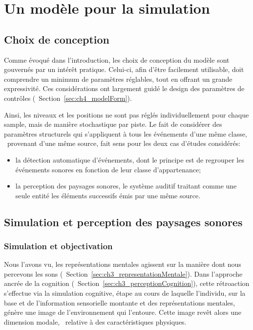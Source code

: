 \section{Un modèle pour la simulation}
\label{sec:ch4_modAnaSo}

\subsection{Choix de conception}

Comme évoqué dans l'introduction, les choix de conception du modèle sont gouvernés par un intérêt pratique. Celui-ci, afin d'être facilement utilisable, doit comprendre un minimum de paramètres réglables, tout en offrant un grande expressivité. Ces considérations ont largement guidé le design des paramètres de contrôles (\cf~Section~\ref{sec:ch4_modelForm}).

Ainsi, les niveaux et les positions ne sont pas réglés individuellement pour chaque sample, mais de manière stochastique par piste. Le fait de considérer des paramètres structurels qui s'appliquent à tous les événements d'une même classe, \ie~provenant d'une même source, fait sens pour les deux cas d'études considérés:

\begin{itemize}
\item la détection automatique d'événements, dont le principe est de regrouper les événements sonores en fonction de leur classe d'appartenance;
\item la perception des paysages sonores, le système auditif traitant comme une seule entité les éléments successifs émis par une même source.
\end{itemize}

\subsection{Simulation et perception des paysages sonores}

\subsubsection{Simulation et objectivation}

Nous l'avons vu, les représentations mentales agissent sur la manière dont nous percevons les sons (\cf~Section~\ref{sec:ch3_representationMentale}). Dans l'approche ancrée de la cognition (\cf~Section~\ref{sec:ch3_perceptionCognition}), cette rétroaction s'effectue via la simulation cognitive, étape au cours de laquelle l'individu, sur la base et de l'information sensorielle montante et des représentations mentales, génère une image de l'environnement qui l'entoure. Cette image revêt alors une dimension modale, \ie~relative à des caractéristiques physiques.

